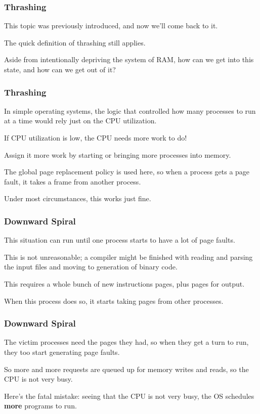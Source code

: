 \begin{frame}
\frametitle{Thrashing}
This topic was previously introduced, and now we'll come back to it.

The quick definition of thrashing still applies.

Aside from intentionally depriving the system of RAM, how can we get into this state, and how can we get out of it?


\end{frame}

\begin{frame}
\frametitle{Thrashing}

In simple operating systems, the logic that controlled how many processes to run at a time would rely just on the CPU utilization. 

If CPU utilization is low, the CPU needs more work to do! 

Assign it more work by starting or bringing more processes into memory. 

The global page replacement policy is used here, so when a process gets a page fault, it takes a frame from another process. 

Under most circumstances, this works just fine.

\end{frame}

\begin{frame}
\frametitle{Downward Spiral}

This situation can run until one process starts to have a lot of page faults. 

This is not unreasonable; a compiler might be finished with reading and parsing the input files and moving to generation of binary code. 

This requires a whole bunch of new instructions pages, plus pages for output. 

When this process does so, it starts taking pages from other processes.

\end{frame}

\begin{frame}
\frametitle{Downward Spiral}

The victim processes need the pages they had, so when they get a turn to run, they too start generating page faults. 

So more and more requests are queued up for memory writes and reads, so the CPU is not very busy. 

Here's the fatal mistake: seeing that the CPU is not very busy, the OS schedules \textbf{more} programs to run.  

\end{frame}

